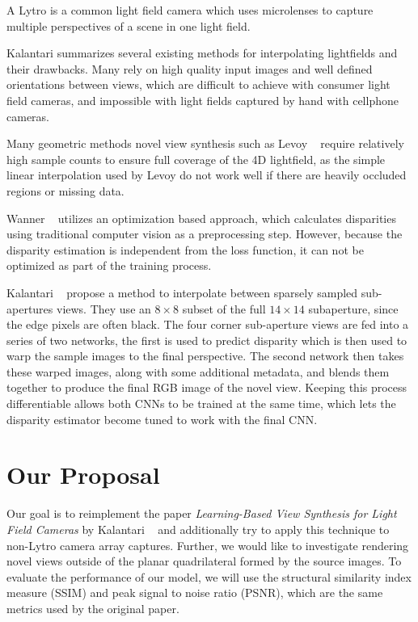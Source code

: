 \documentclass[10pt,twocolumn,letterpaper]{article}
\begin{document}
A Lytro is a common light field camera which uses microlenses to capture multiple
perspectives of a scene in one light field. 

Kalantari summarizes several existing methods for interpolating lightfields and their drawbacks.
Many rely on high quality input images and well defined orientations between views,
which are difficult to achieve with consumer light field cameras, and impossible with light fields
captured by hand with cellphone cameras.

Many geometric methods novel view synthesis 
such as Levoy \etal~\cite{levoy1996light} require relatively high sample counts to ensure full
coverage of the 4D lightfield, as the simple linear interpolation used by Levoy
do not work well if there are heavily occluded regions or missing data.

Wanner \etal~\cite{Wanner} utilizes an optimization based approach, which calculates disparities
using traditional computer vision as a preprocessing step. However, because the disparity estimation
is independent from the loss function, it can not be optimized as part of the training process. 

Kalantari \etal~\cite{LearningViewSynthesis} propose a method to interpolate between 
sparsely sampled sub-apertures views. They use an $8 \times 8$ subset of the full $14 \times 14$ subaperture, since the
edge pixels are often black. The four corner sub-aperture views are fed into a series of two 
networks, the first is used to predict disparity which is then used to warp the sample images to the final perspective.
The second network then takes these warped images, along with some additional metadata, and blends them together
to produce the final RGB image of the novel view. Keeping this process differentiable allows both CNNs to 
be trained at the same time, which lets the disparity estimator become tuned to work with the final CNN.

\section{Our Proposal}

Our goal is to reimplement the paper \textit{Learning-Based View Synthesis for Light Field Cameras} by 
Kalantari \etal~\cite{LearningViewSynthesis} and additionally try to apply this technique to non-Lytro camera
array captures. Further, we would like to investigate rendering novel views outside of the planar
quadrilateral formed by the source images. To evaluate the performance of our model, we will use 
the structural similarity index measure (SSIM) and peak signal to noise ratio (PSNR), which are the 
same metrics used by the original paper.
\end{document}
